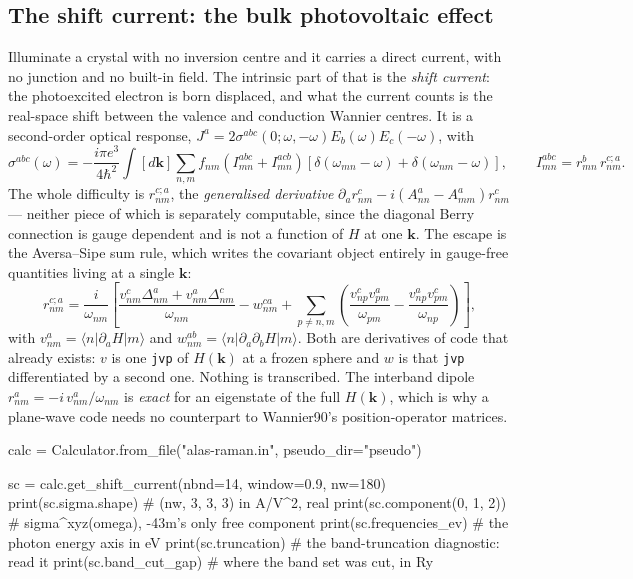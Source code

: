\documentclass[11pt,a4paper]{article}
\newcommand{\code}[1]{\texttt{\small #1}}
\begin{document}
\subsection{The shift current: the bulk photovoltaic effect}

Illuminate a crystal with no inversion centre and it carries a direct current,
with no junction and no built-in field. The intrinsic part of that is the
\emph{shift current}: the photoexcited electron is born displaced, and what the
current counts is the real-space shift between the valence and conduction
Wannier centres. It is a second-order optical response,
$J^a = 2\sigma^{abc}(0;\omega,-\omega)E_b(\omega)E_c(-\omega)$, with
\begin{equation*}
\sigma^{abc}(\omega) = -\frac{i\pi e^3}{4\hbar^2}\int\![d\mathbf k]
  \sum_{n,m} f_{nm}\left(I^{abc}_{mn}+I^{acb}_{mn}\right)
  \left[\delta(\omega_{mn}-\omega)+\delta(\omega_{nm}-\omega)\right],
  \qquad I^{abc}_{mn} = r^b_{mn}\,r^{c;a}_{nm} .
\end{equation*}
The whole difficulty is $r^{c;a}_{nm}$, the \emph{generalised derivative}
$\partial_a r^c_{nm} - i(A^a_{nn}-A^a_{mm})r^c_{nm}$ --- neither piece of which
is separately computable, since the diagonal Berry connection is gauge dependent
and is not a function of $H$ at one $\mathbf k$. The escape is the Aversa--Sipe
sum rule, which writes the covariant object entirely in gauge-free quantities
living at a single $\mathbf k$:
\begin{equation*}
r^{c;a}_{nm} = \frac{i}{\omega_{nm}}\left[
  \frac{v^c_{nm}\Delta^a_{nm} + v^a_{nm}\Delta^c_{nm}}{\omega_{nm}}
  - w^{ca}_{nm}
  + \sum_{p\neq n,m}\left(\frac{v^c_{np}v^a_{pm}}{\omega_{pm}}
                        - \frac{v^a_{np}v^c_{pm}}{\omega_{np}}\right)\right],
\end{equation*}
with $v^a_{nm} = \langle n|\partial_a H|m\rangle$ and
$w^{ab}_{nm} = \langle n|\partial_a\partial_b H|m\rangle$. Both are derivatives
of code that already exists: $v$ is one \code{jvp} of $H(\mathbf k)$ at a frozen
sphere and $w$ is that \code{jvp} differentiated by a second one. Nothing is
transcribed. The interband dipole $r^a_{nm} = -i\,v^a_{nm}/\omega_{nm}$ is
\emph{exact} for an eigenstate of the full $H(\mathbf k)$, which is why a
plane-wave code needs no counterpart to Wannier90's position-operator matrices.

\begin{pycode}
calc = Calculator.from_file("alas-raman.in", pseudo_dir="pseudo")

sc = calc.get_shift_current(nbnd=14, window=0.9, nw=180)
print(sc.sigma.shape)            # (nw, 3, 3, 3) in A/V^2, real
print(sc.component(0, 1, 2))     # sigma^xyz(omega), -43m's only free component
print(sc.frequencies_ev)         # the photon energy axis in eV
print(sc.truncation)             # the band-truncation diagnostic: read it
print(sc.band_cut_gap)           # where the band set was cut, in Ry
\end{pycode}
\end{document}

